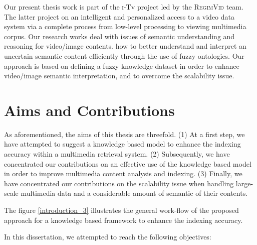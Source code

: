 	Our present thesis work is part of the \textsc{i-Tv} project led by the \textsc{RegimVid} team. 
	The latter project  on an intelligent and personalized access to a video data system via 
	a complete process from low-level processing to viewing multimedia corpus. Our research works deal 
	with issues of semantic understanding and reasoning for video/image contents. 
	how to better understand and interpret an uncertain semantic content efficiently through
	the use of fuzzy ontologies. Our approach is based on defining a fuzzy knowledge dataset in order to 
	enhance video/image semantic interpretation, and to overcome the scalability issue. 




	

	\section{Aims and Contributions}
As aforementioned, the aims of this thesis are threefold. (1) At a first step, we have attempted to suggest a knowledge based model to enhance the indexing accuracy within a multimedia retrieval system. (2) Subsequently, we have concentrated our contributions on an effective use of the knowledge based model in order to improve multimedia content analysis and indexing. (3) Finally, we have concentrated our contributions on the scalability issue when handling large-scale multimedia data and a considerable amount of semantic of their contents.

The figure \ref{introduction_3} illustrates the general work-flow of the proposed approach for a knowledge based framework to enhance the indexing accuracy.


In this dissertation, we attempted to reach the following objectives:

